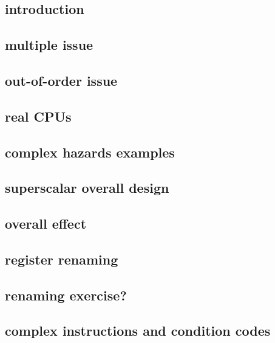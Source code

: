 
\subsection{introduction}

\subsection{multiple issue}


\subsection{out-of-order issue}


\subsection{real CPUs}


\subsection{complex hazards examples}

\subsection{superscalar overall design}



\subsection{overall effect}


\subsection{register renaming}



\subsection{renaming exercise?}



\subsection{complex instructions and condition codes}


